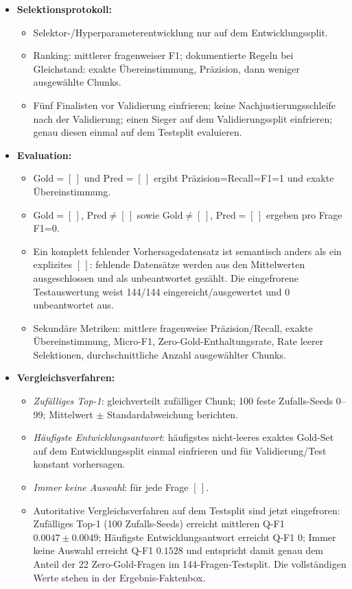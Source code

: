 \documentclass[11pt]{article}
\begin{document}
\begin{leitfragenbox}
\begin{itemize}
\begin{itemize}
    \end{itemize}
    \item \textbf{Selektionsprotokoll:}
    \begin{itemize}
        \item Selektor-/Hyperparameterentwicklung nur auf dem Entwicklungssplit.
        \item Ranking: mittlerer fragenweiser F1; dokumentierte Regeln bei Gleichstand: exakte Übereinstimmung, Präzision, dann weniger ausgew\"ahlte Chunks.
        \item F\"unf Finalisten vor Validierung einfrieren; keine Nachjustierungsschleife nach der Validierung; einen Sieger auf dem Validierungssplit einfrieren; genau diesen einmal auf dem Testsplit evaluieren.
    \end{itemize}
    \item \textbf{Evaluation:}
    \begin{itemize}
        \item $\text{Gold}=[\,]$ und $\text{Pred}=[\,]$ ergibt Präzision=Recall=F1=1 und exakte Übereinstimmung.
        \item $\text{Gold}=[\,]$, $\text{Pred}\neq[\,]$ sowie $\text{Gold}\neq[\,]$, $\text{Pred}=[\,]$ ergeben pro Frage F1=0.
        \item Ein komplett fehlender Vorhersagedatensatz ist semantisch anders als ein explizites $[\,]$: fehlende Datensätze werden aus den Mittelwerten ausgeschlossen und als unbeantwortet gez\"ahlt. Die eingefrorene Testauswertung weist 144/144 eingereicht/ausgewertet und 0 unbeantwortet aus.
        \item Sekundäre Metriken: mittlere fragenweise Präzision/Recall, exakte Übereinstimmung, Micro-F1, Zero-Gold-Enthaltungsrate, Rate leerer Selektionen, durchschnittliche Anzahl ausgewählter Chunks.
    \end{itemize}
    \item \textbf{Vergleichsverfahren:}
    \begin{itemize}
        \item \textit{Zufälliges Top-1}: gleichverteilt zufälliger Chunk; 100 feste Zufalls-Seeds 0--99; Mittelwert $\pm$ Standardabweichung berichten.
        \item \textit{Häufigste Entwicklungsantwort}: h\"aufigstes nicht-leeres exaktes Gold-Set auf dem Entwicklungssplit einmal einfrieren und f\"ur Validierung/Test konstant vorhersagen.
        \item \textit{Immer keine Auswahl}: f\"ur jede Frage $[\,]$.
        \item Autoritative Vergleichsverfahren auf dem Testsplit sind jetzt eingefroren: Zufälliges Top-1 (100 Zufalls-Seeds) erreicht mittleren Q-F1 $0.0047\pm0.0049$; Häufigste Entwicklungsantwort erreicht Q-F1 $0$; Immer keine Auswahl erreicht Q-F1 $0.1528$ und entspricht damit genau dem Anteil der 22 Zero-Gold-Fragen im 144-Fragen-Testsplit. Die vollst\"andigen Werte stehen in der Ergebnis-Faktenbox.
    \end{itemize}
\end{itemize}
\end{leitfragenbox}
\end{document}
